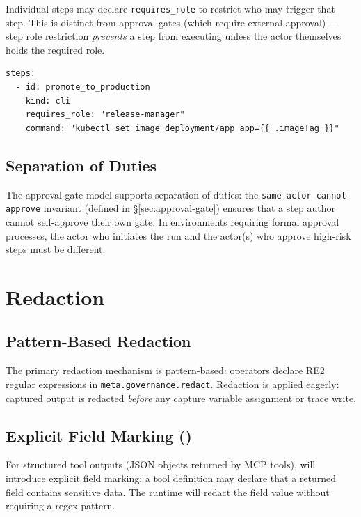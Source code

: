Individual steps may declare \texttt{requires\_role} to restrict who may trigger that step.
This is distinct from approval gates (which require external approval) — step role restriction
\emph{prevents} a step from executing unless the actor themselves holds the required role.

\begin{verbatim}
steps:
  - id: promote_to_production
    kind: cli
    requires_role: "release-manager"
    command: "kubectl set image deployment/app app={{ .imageTag }}"
\end{verbatim}

\subsection{Separation of Duties}

The approval gate model supports separation of duties: the \texttt{same-actor-cannot-approve}
invariant (defined in §\ref{sec:approval-gate}) ensures that a step author cannot self-approve
their own gate. In environments requiring formal approval processes, the actor who initiates
the run and the actor(s) who approve high-risk steps must be different.

\section{Redaction}

\subsection{Pattern-Based Redaction}

The primary redaction mechanism is pattern-based: operators declare RE2 regular expressions
in \texttt{meta.governance.redact}. Redaction is applied eagerly: captured output is
redacted \emph{before} any capture variable assignment or trace write.

\subsection{Explicit Field Marking ()}

For structured tool outputs (JSON objects returned by MCP tools), will introduce explicit
field marking: a tool definition may declare that a returned field contains sensitive data.
The runtime will redact the field value without requiring a regex pattern.

